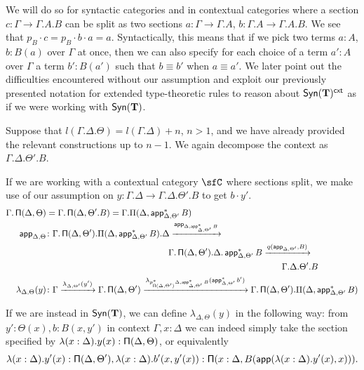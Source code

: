 We will do so for syntactic categories and in contextual categories where a
section $c\colon\Gamma\rightarrow\Gamma.A.B$ can be split as
two sections $a\colon\Gamma\rightarrow\Gamma.A$,
$b\colon\Gamma.A\rightarrow\Gamma.A.B$.
We see that $p_B\cdot c=p_B\cdot b\cdot a=a$. Syntactically, this means that if
we pick two terms $a:A$, $b:B(a)$ over $\Gamma$ at once, then we can also
specify for each choice of a term $a':A$ over $\Gamma$ a term $b':B(a')$ such
that $b\equiv b'$ when $a\equiv a'$. We later point out the
difficulties encountered without our assumption and exploit our previously
presented notation for extended type-theoretic rules to reason about
$\mathsf{Syn}(\mathbf{T})^{\operatorname{\mathsf{cxt}}}$ as if we were working with $\mathsf{Syn}(\mathbf{T})$.

\begin{construction}[Part 2]
  Suppose that
  $l(\Gamma.\Delta.\Theta)=l(\Gamma.\Delta)+n$, $n>1$, and we have already
  provided the relevant constructions up to $n-1$. We again decompose
  the context as $\Gamma.\Delta.\Theta'.B$.

  If we are working with a contextual category $\sfC$ where sections split, we
  make use of our assumption on
  $y\colon\Gamma.\Delta\rightarrow\Gamma.\Delta.\Theta'.B$ to get $b\cdot y'$.
  \begin{align*}
    \Gamma.\operatorname{\mathsf{\Pi}}(\Delta,\Theta)
    &=\Gamma.\operatorname{\mathsf{\Pi}}(\Delta,\Theta'.B)=\Gamma.\Pi(\Delta,\operatorname{\mathsf{app}}^*_{\Delta,\Theta'}B) \\
    \operatorname{\mathsf{app}}_{\Delta,\Theta}
    &\colon\Gamma.\operatorname{\mathsf{\Pi}}(\Delta,\Theta').\Pi(\Delta,\operatorname{\mathsf{app}}^*_{\Delta,\Theta'}B).\Delta
    \xrightarrow{\operatorname{\mathsf{app}}_{\Delta,\operatorname{\mathsf{app}}^*_{\Delta,\Theta'}B}} \\
    &\quad\quad\quad\quad\quad\quad\quad\quad\quad\quad\quad\quad\quad\quad
    \Gamma.\operatorname{\mathsf{\Pi}}(\Delta,\Theta').\Delta.\operatorname{\mathsf{app}}^*_{\Delta,\Theta'}B
    \xrightarrow{q(\operatorname{\mathsf{app}}_{\Delta,\Theta'},B)} \\
    &\quad\quad\quad\quad\quad\quad\quad\quad\quad\quad\quad\quad\quad\quad\quad\quad\quad\quad\quad\quad\quad\quad\quad\quad\quad\quad\quad
    \Gamma.\Delta.\Theta'.B \\
    \lambda_{\Delta,\Theta}(y)
    &\colon\Gamma
    \xrightarrow{\lambda_{\Delta,\Theta'}(y')}
    \Gamma.\operatorname{\mathsf{\Pi}}(\Delta,\Theta')
    \xrightarrow{\lambda_{p^*_{\operatorname{\mathsf{\Pi}}(\Delta,\Theta')}\Delta,\operatorname{\mathsf{app}}^*_{\Delta,\Theta'}B}(\operatorname{\mathsf{app}}_{\Delta,\Theta'}^*b')}
    \Gamma.\operatorname{\mathsf{\Pi}}(\Delta,\Theta').\Pi(\Delta,\operatorname{\mathsf{app}}^*_{\Delta,\Theta'}B)
  \end{align*}

  If we are instead in $\mathsf{Syn}(\mathbf{T})$, we can define $\lambda_{\Delta,\Theta}(y)$ in
  the following way: from $y':\Theta(x),b:B(x,y')$ in context $\Gamma,x:\Delta$
  we can indeed simply take the section specified
  by $\lambda(x:\Delta).y(x):\operatorname{\mathsf{\Pi}}(\Delta,\Theta)$, or equivalently
  $$\lambda(x:\Delta).y'(x):\operatorname{\mathsf{\Pi}}(\Delta,\Theta'),
  \lambda(x:\Delta).b'(x,y'(x)):\operatorname{\mathsf{\Pi}}(x:\Delta,B(\operatorname{\mathsf{app}}(\lambda(x:\Delta).y'(x),x))).$$
\end{construction}

